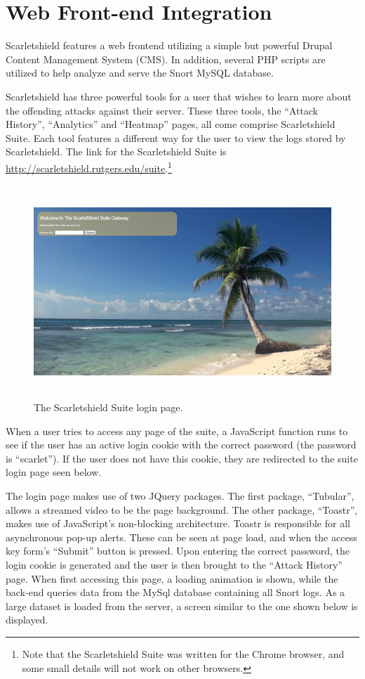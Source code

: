 \documentclass[12pt,letterpaper,titlepage]{report}
\begin{document}
{\section{Web Front-end Integration}


Scarletshield features a web frontend utilizing a simple but powerful Drupal
Content Management System (CMS).  In addition, several PHP scripts are
utilized to help analyze and serve the Snort MySQL database.

Scarletshield has three powerful tools for a user that wishes to learn more
about the offending attacks against their server. These three tools, the ``Attack
History'', ``Analytics'' and ``Heatmap'' pages, all come comprise
Scarletshield Suite. Each tool features a different way for the user to view
the logs stored by Scarletshield. The link for the Scarletshield Suite is
\url{http://scarletshield.rutgers.edu/suite}.\footnote{Note that the Scarletshield Suite was
written for the Chrome browser, and some small details will not work on other
browsers.}

\begin{figure}[bth]
\centering
  \includegraphics[height=8cm]{./login.png}
  \caption{The Scarletshield Suite login page.}
\end{figure}

When a user tries to access any page of the suite, a JavaScript function runs to
see if the user has an active login cookie with the correct password (the
password is ``scarlet'').  If the user does not have this cookie, they are
redirected to the suite login page seen below.


The login page makes use of two JQuery packages.  The first package,
``Tubular'', allows a streamed video to be the page background.  The other
package, ``Toastr'', makes use of JavaScript’s non-blocking
architecture.  Toastr is responsible for all asynchronous pop-up alerts.  These
can be seen at page load, and when the access key form's ``Submit'' button is
pressed. Upon entering the correct password, the login cookie is generated and
the user is then brought to the ``Attack History'' page. When first accessing this
page, a loading animation is shown, while the back-end queries data from the MySql
database containing all Snort logs. As a large dataset is loaded from the
server, a screen similar to the one shown below is displayed.

}
\end{document}
